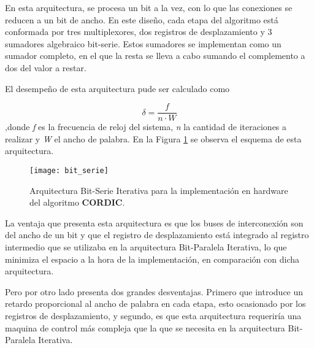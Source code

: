 En esta arquitectura, se procesa un bit a la vez, con lo que las conexiones se reducen a un bit de ancho. En este diseño, cada etapa del algoritmo está conformada por tres multiplexores, dos registros de desplazamiento y 3 sumadores algebraico bit-serie. Estos sumadores se implementan como un sumador completo, en el que la resta se lleva a cabo sumando el complemento a dos del valor a restar.

El desempeño de esta arquitectura pude ser calculado como

\begin{equation}\label{eq:desem-serie}
\delta = \dfrac{f}{n \cdot W}
\end{equation}
,donde \textit{f} es la frecuencia de reloj del sistema, \textit{n} la cantidad de iteraciones a realizar y \textit{W} el ancho de palabra. En la Figura \ref{fig:bit_serie} se observa el esquema de esta arquitectura.

\begin{figure}[htb]
  \centering
  \texttt{[image: bit\_serie]}
  \caption{Arquitectura Bit-Serie Iterativa para la implementación en hardware del algoritmo \textbf{CORDIC}.}
  \label{fig:bit_serie}
\end{figure}

La ventaja que presenta esta arquitectura es que los buses de interconexión son del ancho de un bit y que el registro de desplazamiento está integrado al registro intermedio que se utilizaba en la arquitectura Bit-Paralela Iterativa, lo que minimiza el espacio a la hora de la implementación, en comparación con dicha arquitectura. 

Pero por otro lado presenta dos grandes desventajas. Primero que introduce un retardo proporcional al ancho de palabra en cada etapa, esto ocasionado por los registros de desplazamiento, y segundo, es que esta arquitectura requeriría una maquina de control más compleja que la que se necesita en la arquitectura Bit-Paralela Iterativa.

